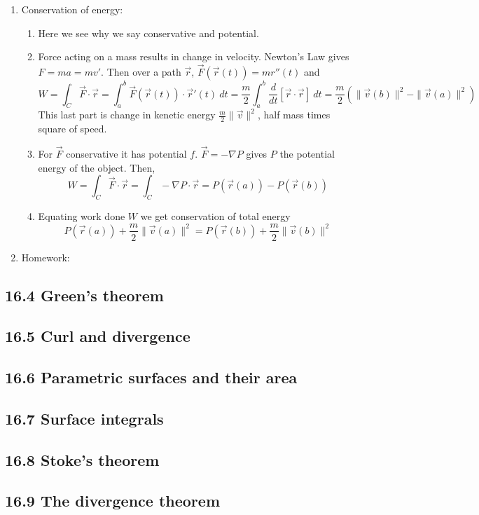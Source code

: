 \documentclass{article}
\begin{document}
\begin{enumerate}
\item Conservation of energy:
\begin{enumerate}
\item Here we see why we say conservative and potential.
\item Force acting on a mass results in change in velocity. Newton's Law gives $F=ma = mv'$. Then over a path $\vec{r}$, $\vec{F}(\vec{r}(t)) = m r''(t)$ and
\[
W = \int_C \vec{F} \cdot \vec{r} = \int_a^b \vec{F}(\vec{r}(t)) \cdot \vec{r}'(t) ~dt = \frac{m}{2} \int_a^b \frac{d}{dt} \left[ \vec{r} \cdot \vec{r} \right] ~dt = \frac{m}{2} \left( \|\vec{v}(b)\|^2 -  \|\vec{v}(a)\|^2 \right)
\]
This last part is change in kenetic energy $\frac{m}{2} \|\vec{v} \|^2$, half mass times square of speed.
\item For $\vec{F}$ conservative it has potential $f$. $\vec{F} = -\nabla P$ gives $P$ the potential energy of the object. Then,
\[
W = \int_C \vec{F} \cdot \vec{r} = \int_C -\nabla P \cdot \vec{r} = P(\vec{r}(a))-P(\vec{r}(b))
\]
\item Equating work done $W$ we get conservation of total energy
\[
P(\vec{r}(a)) + \frac{m}{2} \|\vec{v}(a)\|^2 = P(\vec{r}(b)) + \frac{m}{2} \|\vec{v}(b)\|^2 
\]
\end{enumerate}

\item Homework:

\end{enumerate}


\subsection{16.4 Green's theorem}
\subsection{16.5 Curl and divergence}
\subsection{16.6 Parametric surfaces and their area}
\subsection{16.7 Surface integrals}
\subsection{16.8 Stoke's theorem}
\subsection{16.9 The divergence theorem}
\end{document}
